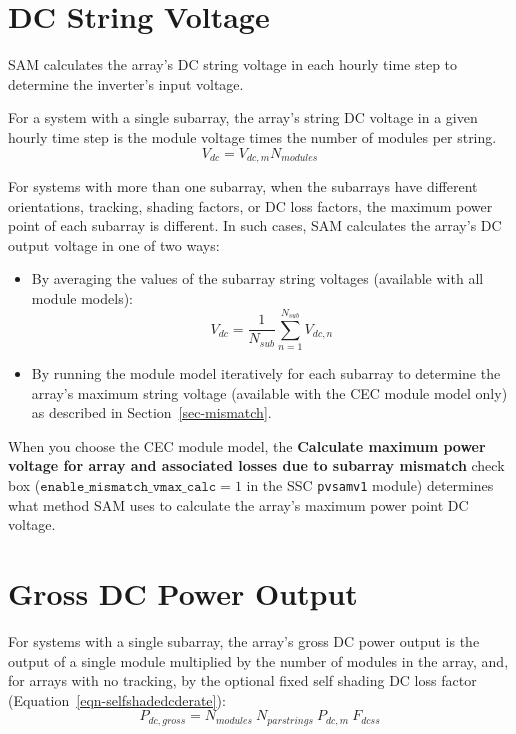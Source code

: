 \documentclass[12pt,letterpaper]{article}
\begin{document}
\section{DC String Voltage}\label{sec-dcstringvoltage}

SAM calculates the array's DC string voltage in each hourly time step to determine the inverter's input voltage.

For a system with a single subarray, the array's string DC voltage in a given hourly time step is the module voltage times the number of modules per string.
\begin{equation}
V_{dc} = V_{dc,m} N_{modules}
\end{equation}

For systems with more than one subarray, when the subarrays have different orientations, tracking, shading factors, or DC loss factors, the maximum power point of each subarray is different. In such cases, SAM calculates the array's DC output voltage in one of two ways:
\begin{itemize}
\item By averaging the values of the subarray string voltages (available with all module models): 
\begin{equation}
V_{dc} =  \frac{1}{N_{sub}}\sum_{n=1}^{N_{sub}} V_{dc,n}
\end{equation}
\item By running the module model iteratively for each subarray to determine the array's maximum string voltage (available with the CEC module model only) as described in Section~\ref{sec-mismatch}.
\end{itemize}

When you choose the CEC module model, the \textbf{Calculate maximum power voltage for array and associated losses due to subarray mismatch} check box ($\mathtt{enable\_mismatch\_vmax\_calc}=1$ in the SSC \texttt{pvsamv1} module) determines what method SAM uses to calculate the array's maximum power point DC voltage.

\section{Gross DC Power Output}

For systems with a single subarray, the array's gross DC power output is the output of a single module multiplied by the number of modules in the array, and, for arrays with no tracking, by the optional fixed self shading DC loss factor (Equation~\ref{eqn-selfshadedcderate}):
\begin{equation}
P_{dc,gross} = N_{modules}~N_{parstrings}~P_{dc,m}~F_{dcss}
\end{equation}
\end{document}
